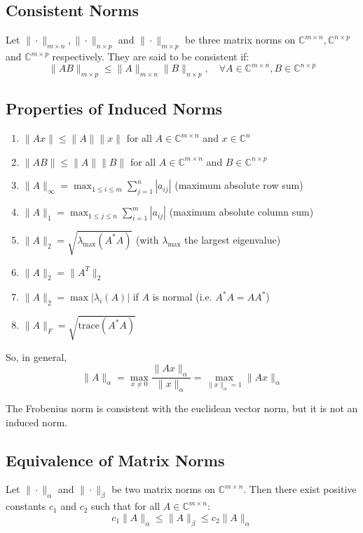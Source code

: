 \documentclass[11pt]{article}
\begin{document}
\subsection{Consistent Norms}
Let $\|\cdot\|_{m \times n}, \|\cdot\|_{n \times p}$ and $\|\cdot\|_{m \times p}$ be three matrix norms on $\mathbb{C}^{m \times n}, \mathbb{C}^{n \times p}$ and $\mathbb{C}^{m \times p}$ respectively. They are said to be consistent if:
\[\|AB\|_{m \times p} \leq \|A\|_{m \times n} \|B\|_{n \times p}, \quad \forall A \in \mathbb{C}^{m \times n}, B \in \mathbb{C}^{n \times p}\]

\subsection{Properties of Induced Norms}
\begin{enumerate}
    \item $\|Ax\| \leq \|A\| \|x\|$ for all $A \in \mathbb{C}^{m \times n}$ and $x \in \mathbb{C}^n$
    \item $\|AB\| \leq \|A\| \|B\|$ for all $A \in \mathbb{C}^{m \times n}$ and $B \in \mathbb{C}^{n \times p}$
    \item $\|A\|_\infty = \max_{1 \leq i \leq m} \sum_{j=1}^{n} |a_{ij}|$ (maximum absolute row sum)
    \item $\|A\|_1 = \max_{1 \leq j \leq n} \sum_{i=1}^{m} |a_{ij}|$ (maximum absolute column sum)
    \item $\|A\|_2 = \sqrt{\lambda_{\max}(A^* A)}$ (with $\lambda_{\max}$ the largest eigenvalue)
    \item $\|A\|_2 = \|A^T\|_2$
    \item $\|A\|_2 = \max |\lambda_i(A)|$ if $A$ is normal (i.e. $A^* A = A A^*$)
    \item $\|A\|_F = \sqrt{\text{trace}(A^* A)}$
\end{enumerate} 

So, in general,
\[\|A\|_\alpha = \max_{x \neq 0} \frac{\|Ax\|_\alpha}{\|x\|_\alpha} = \max_{\|x\|_\alpha = 1} \|Ax\|_\alpha\]

The Frobenius norm is consistent with the euclidean vector norm, but it is not an induced norm.

\subsection{Equivalence of Matrix Norms}
Let $\|\cdot\|_\alpha$ and $\|\cdot\|_\beta$ be two matrix norms on $\mathbb{C}^{m \times n}$. Then there exist positive constants $c_1$ and $c_2$ such that for all $A \in \mathbb{C}^{m \times n}$:
\[c_1 \|A\|_\alpha \leq \|A\|_\beta \leq c_2 \|A\|_\alpha\]
\end{document}
